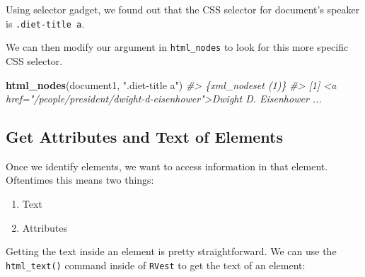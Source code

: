 \documentclass[]{book}
\newenvironment{Shaded}{\begin{snugshade}}{\end{snugshade}}
\newcommand{\CommentTok}[1]{\textcolor[rgb]{0.56,0.35,0.01}{\textit{#1}}}
\newcommand{\KeywordTok}[1]{\textcolor[rgb]{0.13,0.29,0.53}{\textbf{#1}}}
\newcommand{\NormalTok}[1]{#1}
\newcommand{\OperatorTok}[1]{\textcolor[rgb]{0.81,0.36,0.00}{\textbf{#1}}}
\newcommand{\StringTok}[1]{\textcolor[rgb]{0.31,0.60,0.02}{#1}}
\providecommand{\tightlist}{%
  \setlength{\itemsep}{0pt}\setlength{\parskip}{0pt}}
\begin{document}
Using selector gadget, we found out that the CSS selector for document's speaker is \texttt{.diet-title\ a}.

We can then modify our argument in \texttt{html\_nodes} to look for this more specific CSS selector.

\begin{Shaded}
\begin{Highlighting}[]
\KeywordTok{html_nodes}\NormalTok{(document1, }\StringTok{".diet-title a"}\NormalTok{)}
\CommentTok{#> \{xml_nodeset (1)\}}
\CommentTok{#> [1] <a href="/people/president/dwight-d-eisenhower">Dwight D. Eisenhower ...}
\end{Highlighting}
\end{Shaded}

\hypertarget{get-attributes-and-text-of-elements}{%
\subsection{Get Attributes and Text of Elements}\label{get-attributes-and-text-of-elements}}

Once we identify elements, we want to access information in that element. Oftentimes this means two things:

\begin{enumerate}
\def\labelenumi{\arabic{enumi})}
\tightlist
\item
  Text
\item
  Attributes
\end{enumerate}

Getting the text inside an element is pretty straightforward. We can use the \texttt{html\_text()} command inside of \texttt{RVest} to get the text of an element:

\begin{Shaded}
\end{Shaded}
\end{document}
